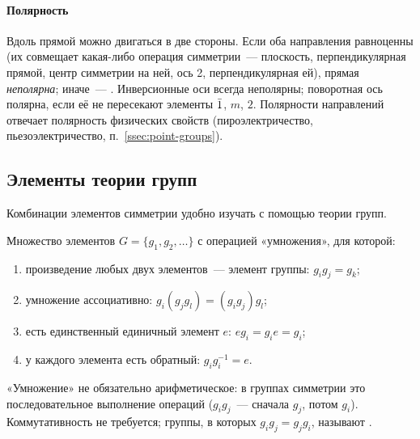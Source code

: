 \paragraph{Полярность}
Вдоль прямой можно двигаться в две стороны. Если оба направления
равноценны (их совмещает какая-либо операция симметрии~— плоскость,
перпендикулярная прямой, центр симметрии на ней, ось 2,
перпендикулярная ей), прямая \emph{неполярна}; иначе~— .
Инверсионные оси всегда неполярны; поворотная ось полярна, если её не
пересекают элементы $\bar{1}$, $m$, $2$. Полярности направлений отвечает
полярность физических свойств (пироэлектричество, пьезоэлектричество,
п.~\ref{ssec:point-groups}).

\subsection{Элементы теории групп}\label{ssec:groups}

Комбинации элементов симметрии удобно изучать с помощью теории групп.

\begin{opredelenie}[Группа]
Множество элементов $G=\{g_1,g_2,\ldots\}$ с операцией «умножения», для
которой:
\begin{enumerate}
\item произведение любых двух элементов~— элемент группы: $g_ig_j=g_k$;
\item умножение ассоциативно: $g_i(g_jg_l)=(g_ig_j)g_l$;
\item есть единственный единичный элемент $e$: $eg_i=g_ie=g_i$;
\item у каждого элемента есть обратный: $g_ig_i^{-1}=e$.
\end{enumerate}
\end{opredelenie}

«Умножение» не обязательно арифметическое: в группах симметрии это
последовательное выполнение операций ($g_ig_j$~— сначала $g_j$, потом $g_i$).
Коммутативность не требуется; группы, в которых $g_ig_j=g_jg_i$,
называют .

